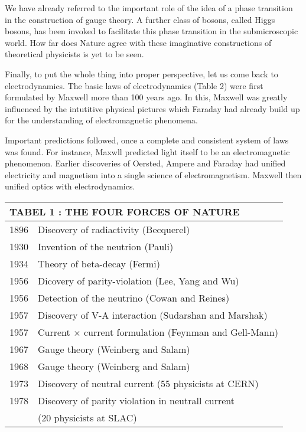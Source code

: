 We have already referred to the important role of the idea of a phase transition in the construction of gauge theory. A further class of bosons, called Higgs bosons, has been invoked to facilitate this phase transition in the submicroscopic world. How far does Nature agree with these imaginative constructions of theoretical physicists is yet to be seen.

Finally, to put the whole thing into proper perspective, let us come back to electrodynamics. The basic laws of electrodynamics (Table 2) were first formulated by Maxwell more than 100 years ago. In this, Maxwell was greatly influenced by the intutitive physical pictures which Faraday had already build up for the understanding of electromagnetic phenomena.

Important predictions followed, once a complete and consistent system of laws was found. For instance, Maxwll predicted light itself to be an electromagnetic phenomenon.  Earlier discoveries of Oersted, Ampere and Faraday had unified electricity and magnetism into a single science of electromagnetism. Maxwell then unified optics with electrodynamics.

\begin{center}
\begin{tabular}{llll}
\multicolumn{4}{l}{{\bf TABEL 1 : THE FOUR FORCES OF NATURE}}\\
\hline
1896 & \multicolumn{3}{l}{Discovery of radiactivity (Becquerel)} \\
1930 & \multicolumn{3}{l}{Invention of the neutrion (Pauli)} \\     
1934     & \multicolumn{3}{l}{Theory of beta-decay (Fermi)} \\
1956     & \multicolumn{3}{l}{Dicovery of parity-violation (Lee, Yang and Wu)} \\
1956     & \multicolumn{3}{l}{Detection of the neutrino (Cowan and Reines)} \\
1957     & \multicolumn{3}{l}{Discovery of V-A interaction (Sudarshan and Marshak)} \\
1957     & \multicolumn{3}{l}{Current $\times$ current formulation (Feynman and Gell-Mann)} \\
1967     & \multicolumn{3}{l}{Gauge theory (Weinberg and Salam)} \\
1968      & \multicolumn{3}{l}{Gauge theory (Weinberg and Salam)} \\
1973     & \multicolumn{3}{l}{Discovery of neutral current (55 physicists at CERN)} \\
1978     & \multicolumn{3}{l}{Discovery of parity violation in neutrall current } \\ 
         &  \multicolumn{3}{l}{(20 physicists at SLAC) } \\               
\hline
\end{tabular}
\end{center}

